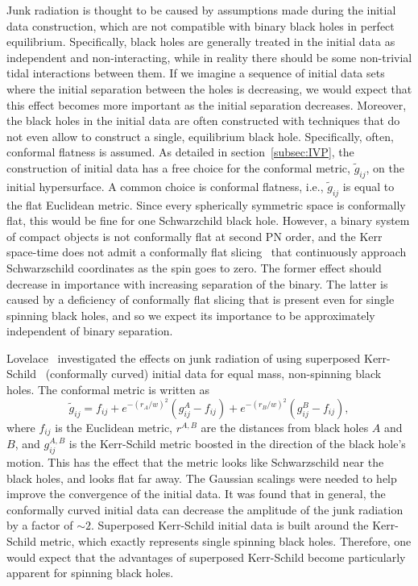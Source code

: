 Junk radiation is thought to be caused by assumptions made during the
initial data construction, which are not compatible with binary black holes in perfect equilibrium. Specifically,
 black holes are generally treated in the
initial data as independent and non-interacting, while in reality
there should be some non-trivial tidal interactions between them. If
we imagine a sequence of initial data sets where the initial
separation between the holes is decreasing, we would expect that this
effect becomes more important as the initial separation decreases. 
Moreover, the black holes in the initial data are often constructed
with techniques that do not even allow to construct a single, equilibrium black  hole.  Specifically, often, conformal flatness is assumed. As detailed in section~\ref{subsec:IVP}, the construction of initial data has a
free choice for the conformal metric, $\tilde{g}_{ij}$, on the initial
hypersurface. A common choice is conformal flatness, i.e.,
$\tilde{g}_{ij}$ is equal to the flat Euclidean metric. Since every
spherically symmetric space is conformally flat, this would be fine
for one Schwarzchild black hole. However,  a
binary system of compact objects is not conformally flat at second PN
order\cite{Rieth:1997}, and the Kerr space-time does not admit a
conformally flat slicing~\cite{GaratPrice:2000} that continuously approach Schwarzschild coordinates as the spin goes to zero. 
The former effect should decrease in importance with increasing separation of the binary.  The latter is caused by a deficiency of conformally flat slicing that is present even for single spinning black holes, and so we expect its importance
to be approximately independent of binary separation.

Lovelace~\cite{Lovelace2009} investigated the effects on junk radiation of using
superposed Kerr-Schild~\cite{Matzner1999,Marronetti-Matzner:2000,Pfeiffer2002a,Lovelace2008} (conformally curved) initial data for equal mass, non-spinning black
holes.  The conformal metric is written as
\begin{equation}
\tilde{g}_{ij}=f_{ij}+e^{-(r_A/w)^2}\left(g_{ij}^A-f_{ij}\right)+e^{-(r_B/w)^2}\left(g_{ij}^B-f_{ij}\right),
\end{equation}
where $f_{ij}$ is the Euclidean metric, $r^{A,B}$ are the distances
from black holes $A$ and $B$, and $g_{ij}^{A,B}$ is the Kerr-Schild metric boosted in
the direction of the black hole's motion. This has the effect that the
metric looks like Schwarzschild near the black holes, and looks flat
far away. The Gaussian scalings were needed to help improve the
convergence of the initial data. It was found that in general, the
conformally curved initial data can decrease the amplitude of the junk
radiation by a factor of $\sim 2$.
Superposed Kerr-Schild initial data is built around the
  Kerr-Schild metric, which exactly represents single spinning black holes.
 Therefore, one would expect that the advantages of superposed Kerr-Schild become particularly apparent for spinning black holes.

